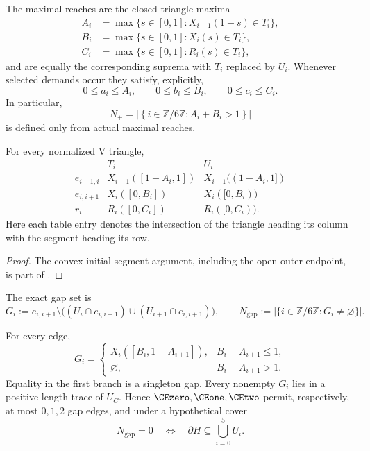 The maximal reaches are the closed-triangle maxima
\[
 \begin{aligned}
 A_i&=\max\{s\in[0,1]:X_{i-1}(1-s)\in T_i\},\\
 B_i&=\max\{s\in[0,1]:X_i(s)\in T_i\},\\
 C_i&=\max\{s\in[0,1]:R_i(s)\in T_i\},
 \end{aligned}
\]
and are equally the corresponding suprema with $T_i$ replaced by $U_i$.
Whenever selected demands occur they satisfy, explicitly,
\[
 0\le a_i\le A_i,
 \qquad
 0\le b_i\le B_i,
 \qquad
 0\le c_i\le C_i.
\]
In particular,
\[
 N_+=\left\lvert\left\{i\in\mathbb Z/6\mathbb Z:
 A_i+B_i>1\right\}\right\rvert
\]
is defined only from actual maximal reaches.

\begin{lemma}
\label{lem:reach-initial-segments}
For every normalized V triangle,
\[
 \begin{array}{c|c|c}
 &T_i&U_i\\ \hline
 e_{i-1,i}&X_{i-1}([1-A_i,1])&X_{i-1}((1-A_i,1])\\
 e_{i,i+1}&X_i([0,B_i])&X_i([0,B_i))\\
 r_i&R_i([0,C_i])&R_i([0,C_i)).
 \end{array}
\]
Here each table entry denotes the intersection of the triangle heading its
column with the segment heading its row.
\end{lemma}

\begin{proof}
The convex initial-segment argument, including the open outer endpoint, is
part of .
\end{proof}

The exact gap set is
\[
 G_i:=e_{i,i+1}\setminus
 \bigl((U_i\cap e_{i,i+1})\cup(U_{i+1}\cap e_{i,i+1})\bigr),
 \qquad
 N_{\mathrm{gap}}:=
 \left\lvert\{i\in\mathbb Z/6\mathbb Z:G_i\ne\varnothing\}\right\rvert.
\]

\begin{lemma}
\label{lem:gap-exhaustion}
For every edge,
\[
 G_i=
 \begin{cases}
 X_i([B_i,1-A_{i+1}]),&B_i+A_{i+1}\le1,\\
 \varnothing,&B_i+A_{i+1}>1.
 \end{cases}
\]
Equality in the first branch is a singleton gap.  Every nonempty $G_i$ lies
in a positive-length trace of $U_C$.  Hence $\CEzero,\CEone,\CEtwo$ permit,
respectively, at most $0,1,2$ gap edges, and under a hypothetical cover
\[
 N_{\mathrm{gap}}=0
 \quad\Longleftrightarrow\quad
 \partial H\subseteq\bigcup_{i=0}^5U_i.
\]
\end{lemma}


